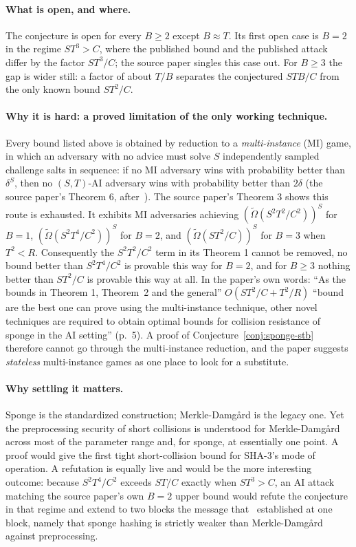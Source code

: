 \documentclass{conjura-conjecture}
\newcommand{\tOm}{\tilde{\Omega}}
\begin{document}
\paragraph{What is open, and where.}
The conjecture is open for every $B \ge 2$ except $B \approx T$. Its
first open case is $B = 2$ in the regime $ST^{3} > C$, where the
published bound and the published attack differ by the factor
$ST^{3}/C$; the source paper singles this case out. For $B \ge 3$ the
gap is wider still: a factor of about $T/B$ separates the conjectured
$STB/C$ from the only known bound $ST^{2}/C$.

\paragraph{Why it is hard: a proved limitation of the only working
  technique.}
Every bound listed above is obtained by reduction to a
\emph{multi-instance} (MI) game, in which an adversary with no advice
must solve $S$ independently sampled challenge salts in sequence: if no
MI adversary wins with probability better than $\delta^{S}$, then no
$(S,T)$-AI adversary wins with probability better than $2\delta$ (the
source paper's Theorem 6, after~\cite{AGL22}). The source paper's
Theorem 3 shows this route is exhausted. It exhibits MI adversaries
achieving $(\tOm(S^{2}T^{2}/C^{2}))^{S}$ for $B = 1$,
$(\tOm(S^{2}T^{4}/C^{2}))^{S}$ for $B = 2$, and
$(\tOm(ST^{2}/C))^{S}$ for $B = 3$ when $T^{2} < R$. Consequently the
$S^{2}T^{2}/C^{2}$ term in its Theorem 1 cannot be removed, no bound
better than $S^{2}T^{4}/C^{2}$ is provable this way for $B = 2$, and
for $B \ge 3$ nothing better than $ST^{2}/C$ is provable this way at
all. In the paper's own words: ``As the bounds in Theorem 1,
Theorem~2 and the general'' $O(ST^{2}/C + T^{2}/R)$ ``bound are the
best one can prove using the multi-instance technique, other novel
techniques are required to obtain optimal bounds for collision
resistance of sponge in the AI setting'' (p.~5). A proof of
Conjecture~\ref{conj:sponge-stb} therefore cannot go through the
multi-instance reduction, and the paper suggests \emph{stateless}
multi-instance games as one place to look for a substitute.

\paragraph{Why settling it matters.}
Sponge is the standardized construction; Merkle-Damg\aa{}rd is the
legacy one. Yet the preprocessing security of short collisions is
understood for Merkle-Damg\aa{}rd across most of the parameter range
and, for sponge, at essentially one point. A proof would give the
first tight short-collision bound for SHA-3's mode of operation. A
refutation is equally live and would be the more interesting outcome:
because $S^{2}T^{4}/C^{2}$ exceeds $ST/C$ exactly when $ST^{3} > C$,
an AI attack matching the source paper's own $B = 2$ upper bound would
refute the conjecture in that regime and extend to two blocks the
message that~\cite{FGK22} established at one block, namely that sponge
hashing is strictly weaker than Merkle-Damg\aa{}rd against
preprocessing.
\end{document}
